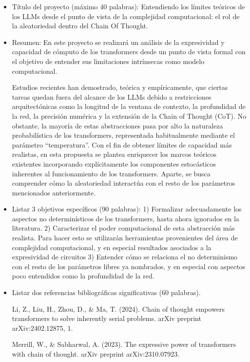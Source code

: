 \documentclass{article}
\begin{document}
\begin{itemize}
    \item  Título del proyecto (máximo 40 palabras):  Entendiendo los límites teóricos de los LLMs desde el punto de vista de la complejidad computacional: el rol de la aleatoriedad dentro del Chain Of Thought.
    
    \item Resumen: En este proyecto se realizará un análisis de la expresividad y capacidad de cómputo de los transformers desde un punto de vista formal con el objetivo de entender sus limitaciones intrínsecas como modelo computacional. 
    
    Estudios recientes han demostrado, teórica y empíricamente, que ciertas tareas quedan fuera del alcance de los LLMs debido a restricciones arquitectónicas como la longitud de la ventana de contexto, la profundidad de la red, la precisión numérica y la extensión de la Chain of Thought (CoT). No obstante, la mayoría de estas abstracciones pasa por alto la naturaleza probabilística de los transformers, representada habitualmente mediante el parámetro ``temperatura''.    Con el fin de obtener límites de capacidad más realistas, en esta propuesta se plantea enriquecer los marcos teóricos existentes incorporando explícitamente los componentes estocásticos inherentes al funcionamiento de los transformers. Aparte, se busca comprender cómo la aleatoriedad interactúa con el resto de los parámetros mencionados anteriormente.

    \item Listar 3 objetivos específicos (90 palabras): 1) Formalizar adecuadamente los aspectos no determinísticos de los transformers, hasta ahora ignorados en la literatura. 2) Caracterizar el poder computacional de esta abstracción más realista. Para hacer esto se utilizarán herramientas provenientes del área de complejidad computacional, y en especial resultados asociados a la expresividad de circuitos 3) Entender cómo se relaciona el no determinismo con el resto de los parámetros libres ya nombrados, y en especial con aspectos poco entendidos como la profundidad de la red. 


    \item Listar dos referencias bibliográficas significativas (60 palabras).
    
    Li, Z., Liu, H., Zhou, D., \& Ma, T. (2024). Chain of thought empowers transformers to solve inherently serial problems. arXiv preprint arXiv:2402.12875, 1.
    
    Merrill, W., \& Sabharwal, A. (2023). The expressive power of transformers with chain of thought. arXiv preprint arXiv:2310.07923.


\end{itemize}
\end{document}

